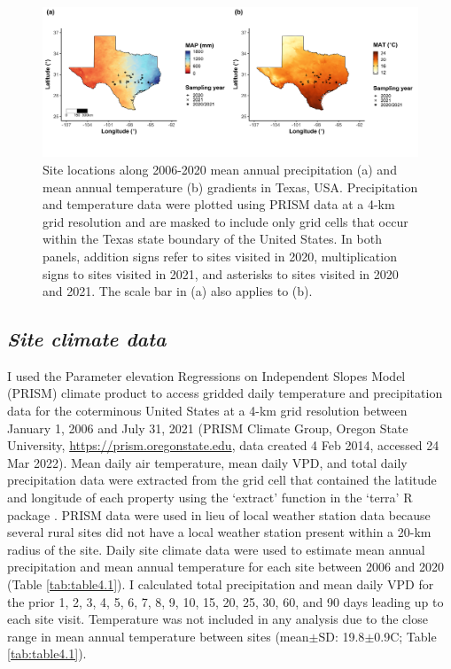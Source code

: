 \newpage
\begin{landscape}
    \begin{figure}
        \centering
        \includegraphics[scale = 0.049]{ch4_TXeco/figs/TXeco_fig1_site_map.png}
        \caption[Site locations along 2006-2020 mean annual precipitation and mean annual temperature gradients in Texas, USA.]{Site locations along 2006-2020 mean annual precipitation (a) and mean annual temperature (b) gradients in Texas, USA. Precipitation and temperature data were plotted using PRISM data at a 4-km grid resolution and are masked to include only grid cells that occur within the Texas state boundary of the United States. In both panels, addition signs refer to sites visited in 2020, multiplication signs to sites visited in 2021, and asterisks to sites visited in 2020 and 2021. The scale bar in (a) also applies to (b).}
        \label{fig:figure4.1}
    \end{figure}
\end{landscape}
\clearpage

\subsection{\textit{Site climate data}}
\noindent I used the Parameter elevation Regressions on Independent Slopes Model (PRISM)  climate product to access gridded daily temperature and precipitation data for the coterminous United States at a 4-km grid resolution between January 1, 2006 and July 31, 2021 (PRISM Climate Group, Oregon State University, \url{https://prism.oregonstate.edu}, data created 4 Feb 2014, accessed 24 Mar 2022). Mean daily air temperature, mean daily VPD, and total daily precipitation data were extracted from the grid cell that contained the latitude and longitude of each property using the `extract’ function in the `terra’ R package . PRISM data were used in lieu of local weather station data because several rural sites did not have a local weather station present within a 20-km radius of the site. Daily site climate data were used to estimate mean annual precipitation and mean annual temperature for each site between 2006 and 2020 (Table \ref{tab:table4.1}). I calculated total precipitation and mean daily VPD for the prior 1, 2, 3, 4, 5, 6, 7, 8, 9, 10, 15, 20, 25, 30, 60, and 90 days leading up to each site visit. Temperature was not included in any analysis due to the close range in mean annual temperature between sites (mean$\pm$SD: 19.8$\pm$0.9\textdegree{}C; Table \ref{tab:table4.1}).

